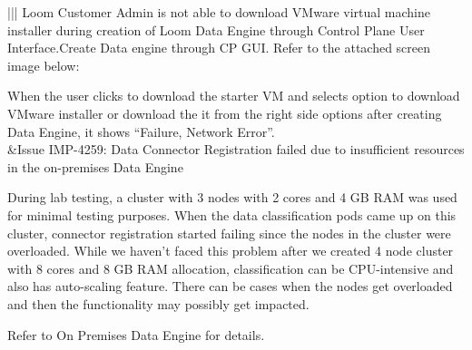 \documentclass[letterpaper,10pt,english]{sphinxhowto}
\begin{document}
\begin{savenotes}
\begin{longtable}{|||}
Loom Customer Admin is not able to download VMware virtual machine installer during
creation of Loom Data Engine through Control Plane User Interface.Create Data engine
through CP GUI. Refer to the attached screen image below:


When the user clicks to download the starter VM and selects option to download
VMware installer or download the it from the right side options after creating Data
Engine, it shows “Failure, Network Error”.
\\
\hline
{}
&Issue IMP-4259: Data Connector Registration failed due to insufficient resources in
the on-premises Data Engine

During lab testing, a cluster with 3 nodes with 2 cores and 4 GB RAM was used for
minimal testing purposes. When the data classification pods came up on this cluster,
connector registration started failing since the nodes in the cluster were
overloaded. While we haven’t faced this problem after we created 4 node cluster with
8 cores and 8 GB RAM allocation, classification can be CPU-intensive and also has
auto-scaling feature. There can be cases when the nodes get overloaded and then the
functionality may possibly get impacted.

 Refer to On Premises Data Engine  for details.
\\
\hline
\end{longtable}\sphinxatlongtableend\end{savenotes}



\renewcommand{\indexname}{Index}
\printindex
\end{document}
